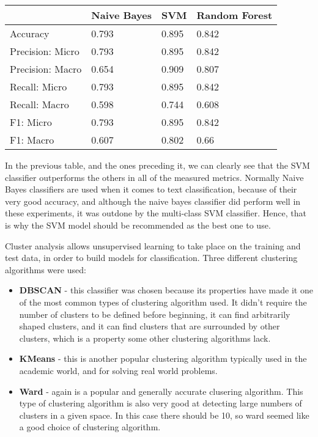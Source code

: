 \documentclass[11pt]{article}
\begin{document}
\begin{center}
\begin{longtable}{| l | l | l | l |}
\hline
& Naive Bayes      & SVM   & Random Forest \\
\hline
Accuracy         & 0.793 & 0.895         & 0.842 \\
Precision: Micro & 0.793 & 0.895         & 0.842 \\
Precision: Macro & 0.654 & 0.909         & 0.807 \\
Recall: Micro    & 0.793 & 0.895         & 0.842 \\
Recall: Macro    & 0.598 & 0.744         & 0.608 \\
F1: Micro        & 0.793 & 0.895         & 0.842 \\
F1: Macro        & 0.607 & 0.802         & 0.66  \\
\hline
\end{longtable}
\end{center}

In the previous table, and the ones preceding it, we can clearly see that the SVM classifier outperforms the others in all of the measured metrics. Normally Naive Bayes classifiers are used when it comes to text classification, because of their very good accuracy, and although the naive bayes classifier did perform well in these experiments, it was outdone by the multi-class SVM classifier. Hence, that is why the SVM model should be recommended as the best one to use.

Cluster analysis allows unsupervised learning to take place on the training and test data, in order to build models for classification. Three different clustering algorithms were used:

\begin{itemize}
\item \textbf{DBSCAN} - this classifier was chosen because its properties have made it one of the most common types of clustering algorithm used. It didn't require the number of clusters to be defined before beginning, it can find arbitrarily shaped clusters, and it can find clusters that are surrounded by other clusters, which is a property some other clustering algorithms lack.
\item \textbf{KMeans} - this is another popular clustering algorithm typically used in the academic world, and for solving real world problems.
\item \textbf{Ward} - again is a popular and generally accurate clusering algorithm. This type of clustering algorithm is also very good at detecting large numbers of clusters in a given space. In this case there should be 10, so ward seemed like a good choice of clustering algorithm.
\end{itemize}
\end{document}
